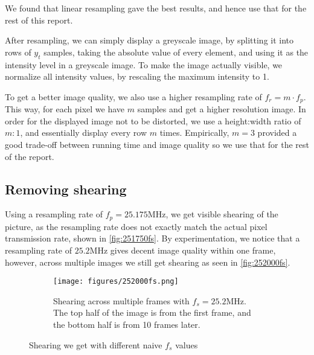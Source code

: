 \documentclass{article}
\begin{document}
We found that linear resampling gave the best results, and hence use that for the rest of this report.

After resampling, we can simply display a greyscale image, by splitting it into rows of $y_t$ samples, taking the absolute value of every element, and using it as the intensity level in a greyscale image. To make the image actually visible, we normalize all intensity values, by rescaling the maximum intensity to 1.

To get a better image quality, we also use a higher resampling rate of $f_r = m \cdot f_p$. This way, for each pixel we have $m$ samples and get a higher resolution image. In order for the displayed image not to be distorted, we use a height:width ratio of $m:1$, and essentially display every row $m$ times. Empirically, $m=3$ provided a good trade-off between running time and image quality so we use that for the rest of the report.

\subsection{Removing shearing}
\label{sec:shearing}

Using a resampling rate of $f_p = 25.175$MHz, we get visible shearing of the picture, as the resampling rate does not exactly match the actual pixel transmission rate, shown in \autoref{fig:251750fs}. By experimentation, we notice that a resampling rate of $25.2$MHz gives decent image quality within one frame, however, across multiple images we still get shearing as seen in \autoref{fig:252000fs}.

\begin{figure}[htb]
\centering
{}
\hfill
\begin{subfigure}{.475\textwidth}
    \centering
    \texttt{[image: figures/252000fs.png]}
    \caption{Shearing across multiple frames with $f_s = 25.2$MHz. The top half of the image is from the first frame, and the bottom half is from 10 frames later.}
    \label{fig:252000fs}
\end{subfigure}

\caption{Shearing we get with different naive $f_s$ values}
\label{fig:shearing}
\end{figure}
\end{document}
